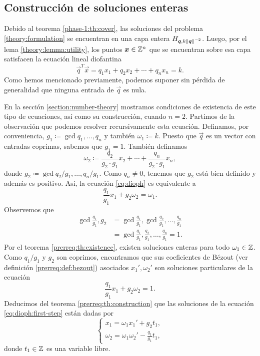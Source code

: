 \subsection{Construcción de soluciones enteras}
\label{subsec:dioph-eq}
\noindent
Debido al teorema \ref{phase-1:th:cover}, las soluciones del problema \eqref{theory:formulation} se
encuentran en una capa entera $H_{\boldsymbol{q}, k\left\lVert \boldsymbol{q} \right\rVert^{-2}}$. Luego, por el lema \ref{theory:lemma:utility}, los
puntos $\boldsymbol{x} \in \mathbb{Z}^n$ que se encuentran sobre esa capa satisfacen la ecuación lineal diofantina
\begin{equation}
	\label{eq:dioph}
	\vec{q}^T\vec{x} = q_1x_1 + q_2x_2 + \cdots + q_nx_n = k.
\end{equation}
Como hemos mencionado previamente, podemos suponer sin pérdida de generalidad que ninguna entrada
de $\vec{q}$ es nula.

En la sección \ref{section:number-theory} mostramos condiciones de existencia
de este tipo de ecuaciones, así como su construcción, cuando $n = 2$. Partimos de la
observación que podemos resolver recursivamente esta ecuación. Definamos, por conveniencia, $g_1
\coloneq \gcd{q_1, \ldots, q_n}$ y también $\omega_1 \coloneq k$. Puesto que $\vec{q}$ es un vector
con entradas coprimas, sabemos que $g_1 = 1$. También definamos
\begin{equation}
	\label{def:dummy:omega-2}
	\omega_2 \coloneq \frac{q_2}{g_2 \cdot g_1}x_2 + \cdots + \frac{q_n}{g_2 \cdot
	g_1}x_n,
\end{equation}
donde $g_2 \coloneq \gcd{q_2/g_1, \ldots, q_n/g_1}$. Como $q_n \neq 0$, tenemos que $g_2$ está bien
definido y además es positivo. Así, la ecuación \eqref{eq:dioph} es equivalente a
\begin{equation}
	\label{eq:dioph:first-step}
	\frac{q_1}{g_1}x_1 + g_2\omega_2 = \omega_1.
\end{equation}
Observemos que
\begin{align*}
	\gcd{\frac{q_1}{g_1}, g_2}
	&= \gcd{\frac{q_1}{g_1}, \gcd{\frac{q_2}{g_1}, \ldots, \frac{q_n}{g_1}}} \\
	&= \gcd{\frac{q_1}{g_1}, \frac{q_2}{g_1}, \ldots, \frac{q_n}{g_1}} = 1.
\end{align*}
Por el teorema \ref{prerreq:th:existence}, existen soluciones enteras para todo $\omega_1 \in \mathbb{Z}$.
Como $q_1/g_1$ y $g_2$ son coprimos, encontramos que sus coeficientes de Bézout (ver definición
\ref{prerreq:def:bezout}) asociados $x_1', \omega_2'$ son soluciones particulares de la ecuación
\begin{equation*}
	\frac{q_1}{g_1}x_1 + g_2\omega_2 = 1.
\end{equation*}
Deducimos del teorema \ref{prerreq:th:construction} que las soluciones de la ecuación
\eqref{eq:dioph:first-step} están dadas por
\begin{equation}
	\label{dummy:eq:first-step}
	\begin{cases}
		x_1 = \omega_1x_1' + g_2t_1, \\
		\omega_2 = \omega_1\omega_2' - \frac{q_1}{g_1}t_1,
	\end{cases}
\end{equation}
donde $t_1 \in \mathbb{Z}$ es una variable libre.


